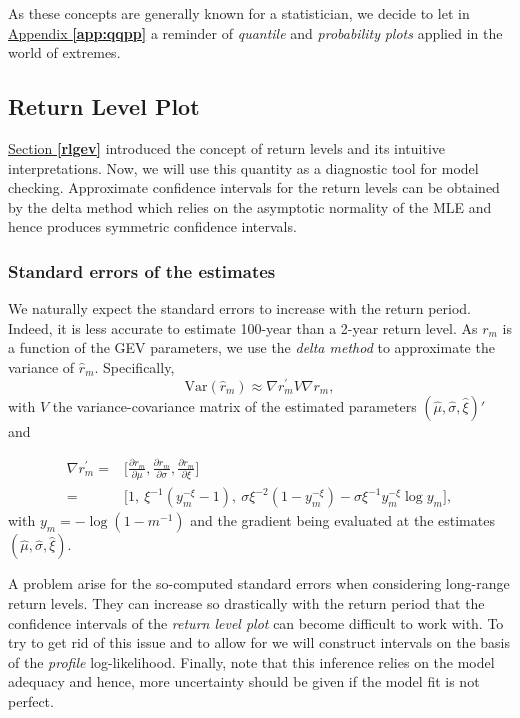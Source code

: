 As these concepts are generally known for a statistician, we decide to let in \hyperref[app:qqpp]{Appendix \textbf{\ref{app:qqpp}}} a reminder of \emph{quantile} and \emph{probability} \emph{plots} applied in the world of extremes.


\subsection{Return Level Plot}\label{rlplot}

\hyperref[rlgev]{Section \textbf{\ref{rlgev}}} introduced the concept of return levels and its intuitive interpretations. Now, we will use this quantity as a diagnostic tool for model checking.  
Approximate confidence intervals for the return levels can be obtained by the
delta method which relies on the asymptotic normality of the MLE and hence produces symmetric confidence intervals.

\subsubsection*{Standard errors of the estimates}
 We naturally expect the standard errors to increase with the return period. Indeed, it is less accurate to estimate 100-year than a 2-year return level.
As $r_m$ is a function of the GEV parameters, we use the \emph{delta method} to approximate the variance of $\hat{r}_m$. Specifically,
\begin{equation*}
\text{Var}(\hat{r}_m)\approx\nabla{r^{'}_m}V\nabla{r_m},
\end{equation*}
with $V$ the variance-covariance matrix of the estimated parameters $(\hat{\mu},\hat{\sigma},\hat{\xi})'$ and 

\begin{equation} \label{delta}
\begin{aligned}
\nabla r^{'}_m=
& \Bigg[\frac{\partial r_m}{\partial\mu},\frac{\partial r_m}{\partial\sigma},\frac{\partial r_m}{\partial\xi}\Bigg] \\ 
= & \Big[1,\ \xi^{-1}(y_m^{-\xi}-1),\ \sigma\xi^{-2}(1-y_m^{-\xi})-\sigma\xi^{-1}y_m^{-\xi}\log y_m\Big],
\end{aligned}
\end{equation}
with $y_m=-\log (1-m^{-1})$ and the gradient being evaluated at the estimates $(\hat{\mu},\hat{\sigma},\hat{\xi})$.

A problem arise for the so-computed standard errors when considering long-range return levels. They can increase so drastically with the return period that the confidence intervals of the \emph{return level plot} can become difficult to work with. To try to get rid of this issue and to allow for we will construct intervals on the basis of the \emph{profile} log-likelihood. Finally, note that this inference relies on the model adequacy and hence, more uncertainty should be given if the model fit is not perfect.

